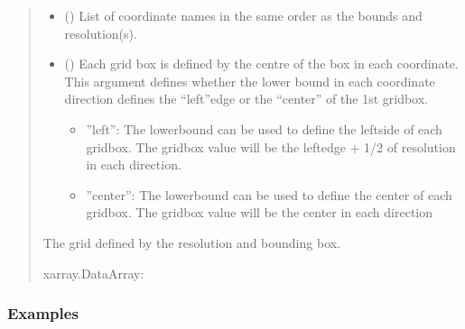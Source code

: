 \documentclass[letterpaper,10pt,english]{sphinxmanual}
\begin{document}
\begin{fulllineitems}
\begin{quote}
\begin{description}
\begin{itemize}
\item {}
\sphinxAtStartPar
{} (\sphinxstyleliteralemphasis{\sphinxupquote{{[}}}\sphinxstyleliteralemphasis{\sphinxupquote{{]}}}) \textendash{} List of coordinate names in the same order as the bounds and
resolution(s).

\item {}
\sphinxAtStartPar
{} (\sphinxstyleliteralemphasis{\sphinxupquote{ (}}\sphinxstyleliteralemphasis{\sphinxupquote{ | }}\sphinxstyleliteralemphasis{\sphinxupquote{)}}) \textendash{}
\sphinxAtStartPar
Each grid box is defined by the centre of the box in each coordinate.
This argument defines whether the lower bound in each coordinate
direction defines the “left”\sphinxhyphen{}edge or the “center” of the 1st grid\sphinxhyphen{}box.
\begin{itemize}
\item {}
\sphinxAtStartPar
”left”: The lower\sphinxhyphen{}bound can be used to define the left\sphinxhyphen{}side of each
grid\sphinxhyphen{}box. The grid\sphinxhyphen{}box value will be the left\sphinxhyphen{}edge + 1/2 of resolution
in each direction.

\item {}
\sphinxAtStartPar
”center”: The lower\sphinxhyphen{}bound can be used to define the center of each
grid\sphinxhyphen{}box. The grid\sphinxhyphen{}box value will be the center in each direction

\end{itemize}


\end{itemize}

\sphinxAtStartPar
{} \textendash{} The grid defined by the resolution and bounding box.

\sphinxAtStartPar
xarray.DataArray:

\end{description}\end{quote}
\subsubsection*{Examples}


\end{fulllineitems}
\end{document}
